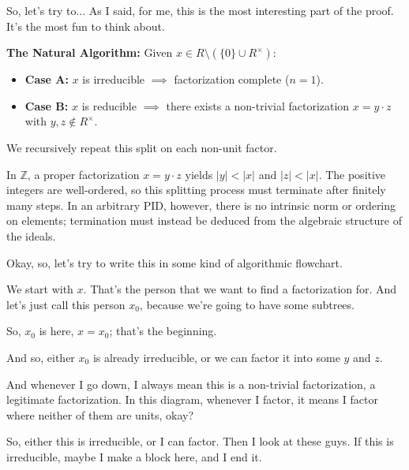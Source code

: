 \begin{proofWrapper}
\begin{speech}[01:00:37 - 01:02:42]
So, let's try to... As I said, for me, this is the most interesting part of the proof. It's the most fun to think about. 
\end{speech}

\begin{content}
\textbf{The Natural Algorithm:}
Given $x \in R \setminus (\{0\} \cup R^\times)$:
\begin{itemize}
    \item \textbf{Case A:} $x$ is irreducible $\implies$ factorization complete ($n = 1$).
    \item \textbf{Case B:} $x$ is reducible $\implies$ there exists a non-trivial factorization $x = y \cdot z$ with $y, z \notin R^\times$.
\end{itemize}
We recursively repeat this split on each non-unit factor.

\begin{steps}
In $\mathbb{Z}$, a proper factorization $x = y \cdot z$ yields $|y| < |x|$ and $|z| < |x|$. The positive integers are well-ordered, so this splitting process must terminate after finitely many steps. In an arbitrary PID, however, there is no intrinsic norm or ordering on elements; termination must instead be deduced from the algebraic structure of the ideals.
\end{steps}
\end{content}

\begin{speech}[01:02:42 - 01:04:42]
Okay, so, let's try to write this in some kind of algorithmic flowchart.

We start with $x$. That's the person that we want to find a factorization for. And let's just call this person $x_0$, because we're going to have some subtrees. 

So, $x_0$ is here, $x = x_0$; that's the beginning.

And so, either $x_0$ is already irreducible, or we can factor it into some $y$ and $z$. 

And whenever I go down, I always mean this is a non-trivial factorization, a legitimate factorization. In this diagram, whenever I factor, it means I factor where neither of them are units, okay?

So, either this is irreducible, or I can factor. Then I look at these guys. If this is irreducible, maybe I make a block here, and I end it. 


\end{speech}
\end{proofWrapper}
